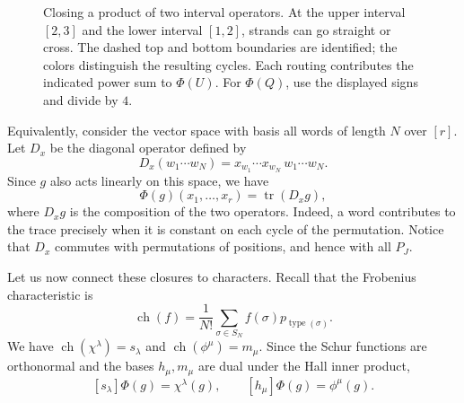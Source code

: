 \documentclass[11pt]{article}
\theoremstyle{definition}
\theoremstyle{remark}
\newcommand{\type}{\operatorname{type}}
\newcommand{\tr}{\operatorname{tr}}
\newcommand{\ch}{\operatorname{ch}}
\begin{document}
\begin{figure}[htbp]
\begin{minipage}{.24\linewidth}
\centering{}
\end{minipage}\hfill%
\begin{minipage}{.24\linewidth}
\centering{}
\end{minipage}\hfill%
\begin{minipage}{.24\linewidth}
\centering{}
\end{minipage}\hfill%
\begin{minipage}{.24\linewidth}
\centering{}
\end{minipage}
\endgroup
\caption{Closing a product of two interval operators.
At the upper interval $[2,3]$ and the lower interval
$[1,2]$, strands can go straight or cross.
The dashed top and bottom boundaries are identified;
the colors distinguish the resulting cycles.
Each routing contributes the indicated power sum
to $\Phi(U)$. For $\Phi(Q)$, use the displayed signs
and divide by $4$.}
\label{fig:closure-example}
\end{figure}


Equivalently, consider the vector space with basis
all words of length $N$ over $[r]$. Let $D_x$ be
the diagonal operator defined by
\[
D_x(w_1\cdots w_N)
=x_{w_1}\cdots x_{w_N}\,w_1\cdots w_N.
\]
Since $g$ also acts linearly on this space, we have
\[
\Phi(g)(x_1,\ldots,x_r)=\tr(D_xg),
\]
where $D_xg$ is the composition of the two operators.
Indeed, a word contributes to the trace precisely
when it is constant on each cycle of the permutation.
Notice that $D_x$ commutes with permutations of
positions, and hence with all $P_J$. 

Let us now connect these closures to characters.
Recall that the Frobenius characteristic is
\[
\ch(f)=\frac1{N!}\sum_{\sigma\in S_N}
f(\sigma)p_{\type(\sigma)}.
\]
We have $\ch(\chi^\lambda)=s_\lambda$ and
$\ch(\phi^\mu)=m_\mu$. Since the Schur functions
are orthonormal and the bases $h_\mu,m_\mu$
are dual under the Hall inner product,
\begin{equation}\label{eq:charclosure}
[s_\lambda]\Phi(g)=\chi^\lambda(g),\qquad
[h_\mu]\Phi(g)=\phi^\mu(g).
\end{equation}
\end{document}
